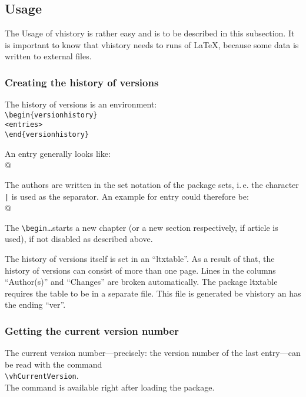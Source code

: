 \subsection{Usage}\label{usage}
The Usage of vhistory is rather easy and is to be described in this subsection.
It is important to know that vhistory needs to runs of \LaTeX, because some data is written to external files.

\subsubsection{Creating the history of versions}\label{begin}
The history of versions is an environment:\\
\mbox{}\hspace{2em}\verb|\begin{versionhistory}|\\
\mbox{}\hspace{2em}\verb|<entries>|\\
\mbox{}\hspace{2em}\verb|\end{versionhistory}|

An entry generally looks like:\\
\mbox{}\hspace{2em}\verb@{}@

The authors are written in the set notation of the package sets, i.\,e. the character \texttt{|} is used as the separator. An example for entry could therefore be:\\
\mbox{}\hspace{2em}\verb@{}@

The \verb|\begin|\ldots starts a new chapter (or a new section respectively, if article is used), if not disabled as described above.

The history of versions itself is set in an ``ltxtable''. As a result of that, the history of versions can consist of more than one page. Lines in the columns ``Author(s)'' and ``Changes'' are broken automatically. The package ltxtable requires the table to be in a separate file. This file is generated be vhistory an has the ending ``ver''.

\subsubsection{Getting the current version number}
The current version number---precisely: the version number of the last entry---can be read with the command\\
\mbox{}\hspace{2em}\verb|\vhCurrentVersion|.\\
The command is available right after loading the package.

